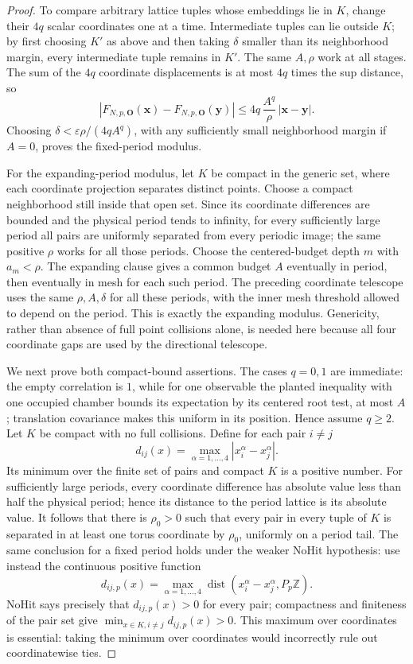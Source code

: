 \begin{proof}
To compare arbitrary lattice tuples whose embeddings lie in $K$, change their $4q$ scalar coordinates one at a time. Intermediate tuples can lie outside $K$; by first choosing $K'$ as above and then taking $\delta$ smaller than its neighborhood margin, every intermediate tuple remains in $K'$. The same $A,\rho$ work at all stages. The sum of the $4q$ coordinate displacements is at most $4q$ times the sup distance, so
\[
 |F_{N,p,\mathbf O}(\mathbf x)-F_{N,p,\mathbf O}(\mathbf y)|
 \leq 4q\,\frac{A^q}{\rho}\,|\mathbf x-\mathbf y|.
\]
Choosing $\delta<\varepsilon\rho/(4qA^q)$, with any sufficiently small neighborhood margin if $A=0$, proves the fixed-period modulus.

For the expanding-period modulus, let $K$ be compact in the generic set, where each coordinate projection separates distinct points. Choose a compact neighborhood still inside that open set. Since its coordinate differences are bounded and the physical period tends to infinity, for every sufficiently large period all pairs are uniformly separated from every periodic image; the same positive $\rho$ works for all those periods. Choose the centered-budget depth $m$ with $a_m<\rho$. The expanding clause gives a common budget $A$ eventually in period, then eventually in mesh for each such period. The preceding coordinate telescope uses the same $\rho,A,\delta$ for all these periods, with the inner mesh threshold allowed to depend on the period. This is exactly the expanding modulus. Genericity, rather than absence of full point collisions alone, is needed here because all four coordinate gaps are used by the directional telescope.

We next prove both compact-bound assertions. The cases $q=0,1$ are immediate: the empty correlation is $1$, while for one observable the planted inequality with one occupied chamber bounds its expectation by its centered root test, at most $A$; translation covariance makes this uniform in its position. Hence assume $q\geq2$. Let $K$ be compact with no full collisions. Define for each pair $i\ne j$
\[
 d_{ij}(x)=\max_{\alpha=1,\ldots,4}|x_i^\alpha-x_j^\alpha|.
\]
Its minimum over the finite set of pairs and compact $K$ is a positive number. For sufficiently large periods, every coordinate difference has absolute value less than half the physical period; hence its distance to the period lattice is its absolute value. It follows that there is $\rho_0>0$ such that every pair in every tuple of $K$ is separated in at least one torus coordinate by $\rho_0$, uniformly on a period tail. The same conclusion for a fixed period holds under the weaker NoHit hypothesis: use instead the continuous positive function
\[
 d_{ij,p}(x)=\max_{\alpha=1,\ldots,4}\operatorname{dist}(x_i^\alpha-x_j^\alpha,P_p\mathbb Z).
\]
NoHit says precisely that $d_{ij,p}(x)>0$ for every pair; compactness and finiteness of the pair set give $\min_{x\in K,i\ne j}d_{ij,p}(x)>0$. This maximum over coordinates is essential: taking the minimum over coordinates would incorrectly rule out coordinatewise ties.


\end{proof}
